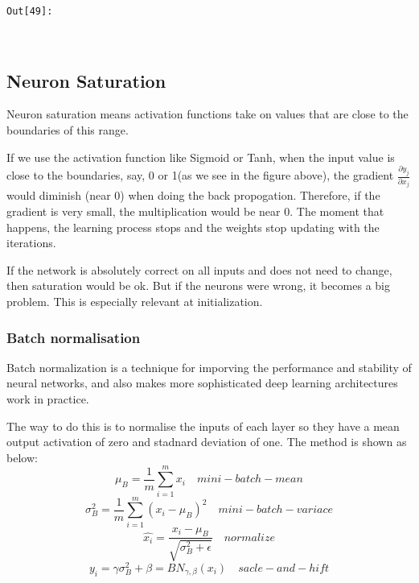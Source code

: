 \documentclass[11pt]{article}
\begin{document}
\texttt{\color{outcolor}Out[{\color{outcolor}49}]:}
    
    \begin{center}
    \end{center}
    { \hspace*{\fill} \\}
    

    \hypertarget{neuron-saturation}{%
\subsection{Neuron Saturation}\label{neuron-saturation}}

Neuron saturation means activation functions take on values that are
close to the boundaries of this range.

If we use the activation function like Sigmoid or Tanh, when the input
value is close to the boundaries, say, 0 or 1(as we see in the figure
above), the gradient \(\frac{\partial{y_j}}{\partial{x_j}}\) would
diminish (near 0) when doing the back propogation. Therefore, if the
gradient is very small, the multiplication would be near 0. The moment
that happens, the learning process stops and the weights stop updating
with the iterations.

If the network is absolutely correct on all inputs and does not need to
change, then saturation would be ok. But if the neurons were wrong, it
becomes a big problem. This is especially relevant at initialization.

    \hypertarget{batch-normalisation}{%
\subsubsection{Batch normalisation}\label{batch-normalisation}}

Batch normalization is a technique for imporving the performance and
stability of neural networks, and also makes more sophisticated deep
learning architectures work in practice.

The way to do this is to normalise the inputs of each layer so they have
a mean output activation of zero and stadnard deviation of one. The
method is shown as below: \[
\mu_{B} = \frac{1}{m}\sum_{i=1}^{m} x_i      \quad mini-batch-mean 
\] \[
\sigma_{B}^{2} = \frac{1}{m}\sum_{i=1}^{m} (x_i - \mu_{B})^2  \quad mini-batch-variace
\] \[
\hat{x_i} = \frac{x_i - \mu_{B}}{\sqrt{\sigma_{B}^{2}+\epsilon}}   \quad normalize
\] \[
y_i = \gamma\sigma_{B}^{2} + \beta = BN_{\gamma,\beta}(x_i)  \quad sacle- and-hift
\]
\end{document}

